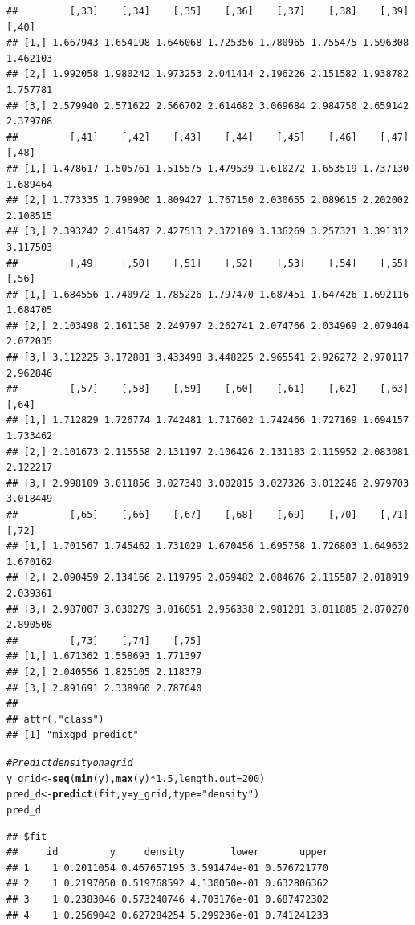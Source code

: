 \documentclass[article]{jss}\usepackage[]{graphicx}\usepackage[]{xcolor}
\makeatletter
\newcommand{\hlnum}[1]{\textcolor[rgb]{0.686,0.059,0.569}{#1}}%
\newcommand{\hlsng}[1]{\textcolor[rgb]{0.192,0.494,0.8}{#1}}%
\newcommand{\hlcom}[1]{\textcolor[rgb]{0.678,0.584,0.686}{\textit{#1}}}%
\newcommand{\hlopt}[1]{\textcolor[rgb]{0,0,0}{#1}}%
\newcommand{\hldef}[1]{\textcolor[rgb]{0.345,0.345,0.345}{#1}}%
\newcommand{\hlkwb}[1]{\textcolor[rgb]{0.69,0.353,0.396}{#1}}%
\newcommand{\hlkwc}[1]{\textcolor[rgb]{0.333,0.667,0.333}{#1}}%
\newcommand{\hlkwd}[1]{\textcolor[rgb]{0.737,0.353,0.396}{\textbf{#1}}}%
\newenvironment{kframe}{%
 \def\at@end@of@kframe{}%
 \ifinner\ifhmode%
  \def\at@end@of@kframe{\end{minipage}}%
  \begin{minipage}{\columnwidth}%
 \fi\fi%
 \def\FrameCommand##1{\hskip\@totalleftmargin \hskip-\fboxsep
 \colorbox{shadecolor}{##1}\hskip-\fboxsep
     \hskip-\linewidth \hskip-\@totalleftmargin \hskip\columnwidth}%
 \MakeFramed {\advance\hsize-\width
   \@totalleftmargin\z@ \linewidth\hsize
   \@setminipage}}%
 {\par\unskip\endMakeFramed%
 \at@end@of@kframe}
\newenvironment{knitrout}{}{} %
\makeatother
\begin{document}
\begin{knitrout}
\begin{kframe}
\begin{verbatim}
##         [,33]    [,34]    [,35]    [,36]    [,37]    [,38]    [,39]    [,40]
## [1,] 1.667943 1.654198 1.646068 1.725356 1.780965 1.755475 1.596308 1.462103
## [2,] 1.992058 1.980242 1.973253 2.041414 2.196226 2.151582 1.938782 1.757781
## [3,] 2.579940 2.571622 2.566702 2.614682 3.069684 2.984750 2.659142 2.379708
##         [,41]    [,42]    [,43]    [,44]    [,45]    [,46]    [,47]    [,48]
## [1,] 1.478617 1.505761 1.515575 1.479539 1.610272 1.653519 1.737130 1.689464
## [2,] 1.773335 1.798900 1.809427 1.767150 2.030655 2.089615 2.202002 2.108515
## [3,] 2.393242 2.415487 2.427513 2.372109 3.136269 3.257321 3.391312 3.117503
##         [,49]    [,50]    [,51]    [,52]    [,53]    [,54]    [,55]    [,56]
## [1,] 1.684556 1.740972 1.785226 1.797470 1.687451 1.647426 1.692116 1.684705
## [2,] 2.103498 2.161158 2.249797 2.262741 2.074766 2.034969 2.079404 2.072035
## [3,] 3.112225 3.172881 3.433498 3.448225 2.965541 2.926272 2.970117 2.962846
##         [,57]    [,58]    [,59]    [,60]    [,61]    [,62]    [,63]    [,64]
## [1,] 1.712829 1.726774 1.742481 1.717602 1.742466 1.727169 1.694157 1.733462
## [2,] 2.101673 2.115558 2.131197 2.106426 2.131183 2.115952 2.083081 2.122217
## [3,] 2.998109 3.011856 3.027340 3.002815 3.027326 3.012246 2.979703 3.018449
##         [,65]    [,66]    [,67]    [,68]    [,69]    [,70]    [,71]    [,72]
## [1,] 1.701567 1.745462 1.731029 1.670456 1.695758 1.726803 1.649632 1.670162
## [2,] 2.090459 2.134166 2.119795 2.059482 2.084676 2.115587 2.018919 2.039361
## [3,] 2.987007 3.030279 3.016051 2.956338 2.981281 3.011885 2.870270 2.890508
##         [,73]    [,74]    [,75]
## [1,] 1.671362 1.558693 1.771397
## [2,] 2.040556 1.825105 2.118379
## [3,] 2.891691 2.338960 2.787640
## 
## attr(,"class")
## [1] "mixgpd_predict"
\end{verbatim}
\begin{alltt}
\hlcom{# Predict density on a grid}
\hldef{y_grid} \hlkwb{<-} \hlkwd{seq}\hldef{(}\hlkwd{min}\hldef{(y),} \hlkwd{max}\hldef{(y)} \hlopt{*} \hlnum{1.5}\hldef{,} \hlkwc{length.out} \hldef{=} \hlnum{200}\hldef{)}
\hldef{pred_d} \hlkwb{<-} \hlkwd{predict}\hldef{(fit,} \hlkwc{y} \hldef{= y_grid,} \hlkwc{type} \hldef{=} \hlsng{"density"}\hldef{)}
\hldef{pred_d}
\end{alltt}
\begin{verbatim}
## $fit
##     id         y     density        lower       upper
## 1    1 0.2011054 0.467657195 3.591474e-01 0.576721770
## 2    1 0.2197050 0.519768592 4.130050e-01 0.632806362
## 3    1 0.2383046 0.573240746 4.703176e-01 0.687472302
## 4    1 0.2569042 0.627284254 5.299236e-01 0.741241233

\end{verbatim}
\end{kframe}
\end{knitrout}
\end{document}
